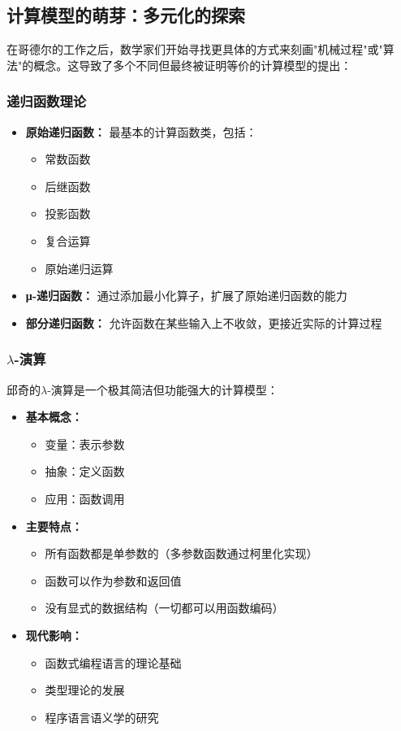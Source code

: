 \documentclass[a4paper,12pt]{ctexart}
\begin{document}
\subsection{计算模型的萌芽：多元化的探索}
在哥德尔的工作之后，数学家们开始寻找更具体的方式来刻画"机械过程"或"算法"的概念。这导致了多个不同但最终被证明等价的计算模型的提出：

\subsubsection{递归函数理论}
\begin{itemize}
    \item \textbf{原始递归函数：} 最基本的计算函数类，包括：
        \begin{itemize}
            \item 常数函数
            \item 后继函数
            \item 投影函数
            \item 复合运算
            \item 原始递归运算
        \end{itemize}
    \item \textbf{μ-递归函数：} 通过添加最小化算子，扩展了原始递归函数的能力
    \item \textbf{部分递归函数：} 允许函数在某些输入上不收敛，更接近实际的计算过程
\end{itemize}

\subsubsection{$\lambda$-演算}
邱奇的$\lambda$-演算是一个极其简洁但功能强大的计算模型：
\begin{itemize}
    \item \textbf{基本概念：}
        \begin{itemize}
            \item 变量：表示参数
            \item 抽象：定义函数
            \item 应用：函数调用
        \end{itemize}
    \item \textbf{主要特点：}
        \begin{itemize}
            \item 所有函数都是单参数的（多参数函数通过柯里化实现）
            \item 函数可以作为参数和返回值
            \item 没有显式的数据结构（一切都可以用函数编码）
        \end{itemize}
    \item \textbf{现代影响：}
        \begin{itemize}
            \item 函数式编程语言的理论基础
            \item 类型理论的发展
            \item 程序语言语义学的研究
        \end{itemize}
\end{itemize}
\end{document}

